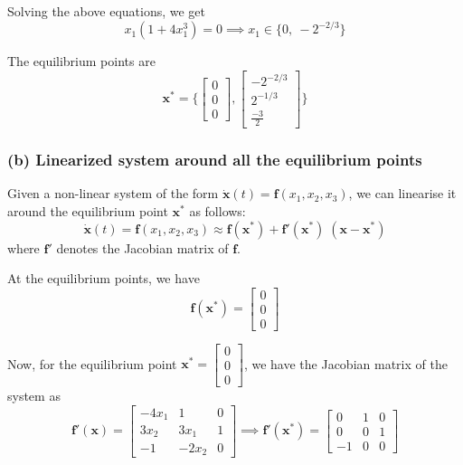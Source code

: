 Solving the above equations, we get
\[
    x_1(1 + 4x_1^3) = 0
    \implies
    x_1 \in \{ 0, \ -2^{-2/3} \}
\]

The equilibrium points are
\[
    \boxed{
        \mathbf{x^*} =
        \Bigg \{
        \begin{bmatrix}
            0 \\
            0 \\
            0
        \end{bmatrix},
        \begin{bmatrix}
            -2^{-2/3} \\
            2^{-1/3}  \\
            \frac{-3}{2}
        \end{bmatrix}
        \Bigg \}
    }
\]

\subsubsection*{(b) Linearized system around all the equilibrium points}

Given a non-linear system of the form \( \mathbf{\dot x}(t) = \mathbf{f}(x_1, x_2, x_3) \), we can linearise it around the equilibrium point \( \mathbf{x^*} \) as follows:
\[
    \mathbf{\dot x}(t) = \mathbf{f}(x_1, x_2, x_3) \approx \mathbf{f}(\mathbf{x^*}) + \mathbf{f'}(\mathbf{x^*})\; (\mathbf{x} - \mathbf{x^*})
\]
where \(\mathbf{f'}\) denotes the Jacobian matrix of \(\mathbf{f}\).

At the equilibrium points, we have
\[
    \mathbf{f}(\mathbf{x^*}) =
    \begin{bmatrix}
        0 \\
        0 \\
        0
    \end{bmatrix}
\]

Now, for the equilibrium point \( \mathbf{x^*} = \begin{bmatrix} 0 \\ 0 \\ 0 \end{bmatrix} \), we have the Jacobian matrix of the system as
\[
    \mathbf{f'}(\mathbf{x}) =
    \begin{bmatrix}
        -4x_1 & 1     & 0 \\
        3x_2  & 3x_1  & 1 \\
        -1    & -2x_2 & 0
    \end{bmatrix}
    \implies
    \mathbf{f'}(\mathbf{x^*}) =
    \begin{bmatrix}
        0  & 1 & 0 \\
        0  & 0 & 1 \\
        -1 & 0 & 0
    \end{bmatrix}
\]

